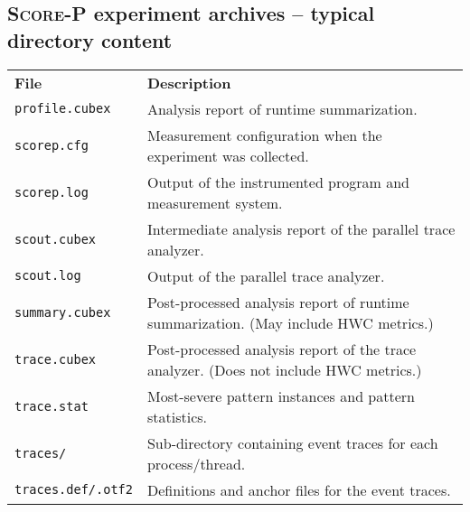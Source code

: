 \documentclass[a4paper]{article}
\newcommand{\Scorep}{\textsc{Score-P}\xspace}
\begin{document}

\subsection*{\Scorep experiment archives -- typical directory content}

    \begin{tabularx}{\linewidth}{lX}
      \textbf{File} & \textbf{Description} \\
        \texttt{profile.cubex} &
                Analysis report of runtime summarization. \\
        \texttt{scorep.cfg} &
                Measurement configuration when the experiment was collected.\\
        \texttt{scorep.log} &
                Output of the instrumented program and measurement system.\\
        \texttt{scout.cubex} &
                Intermediate analysis report of the parallel trace analyzer.\\
        \texttt{scout.log} &
                 Output of the parallel trace analyzer.\\
       \texttt{summary.cubex} &
                Post-processed analysis report of runtime summarization.
                (May include HWC metrics.)\\
        \texttt{trace.cubex} &
                Post-processed analysis report of the trace analyzer.
                (Does not include HWC metrics.)\\
        \texttt{trace.stat} &
                Most-severe pattern instances and pattern statistics.\\
        \texttt{traces/} &
                Sub-directory containing event traces for each process/thread.\\
        \texttt{traces.def/.otf2} &
                Definitions and anchor files for the event traces.\\
    \end{tabularx}
\end{document}
